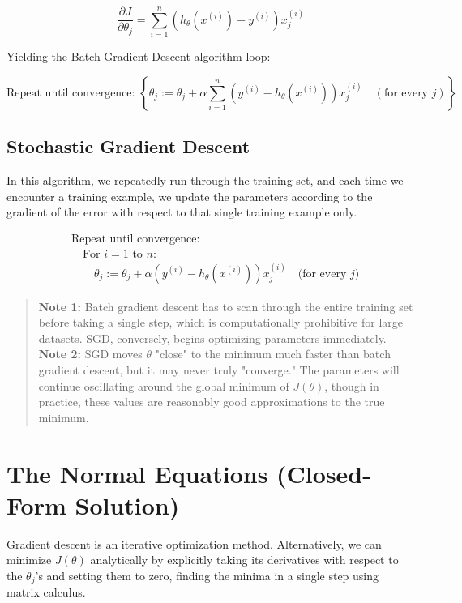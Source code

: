 \documentclass[12pt, a4paper]{report}
\begin{document}
\[ \frac{\partial J}{\partial \theta_j} = \sum_{i=1}^{n} (h_\theta(x^{(i)}) - y^{(i)}) x_j^{(i)} \]

Yielding the Batch Gradient Descent algorithm loop:

\[ \text{Repeat until convergence: } \left\{ \theta_j := \theta_j + \alpha \sum_{i=1}^{n} \left( y^{(i)} - h_\theta(x^{(i)}) \right) x_j^{(i)} \quad (\text{for every } j) \right\} \]

\subsection{Stochastic Gradient Descent}

In this algorithm, we repeatedly run through the training set, and each time we encounter a training example, we update the parameters according to the gradient of the error with respect to that single training example only.

\begin{align*}
& \text{Repeat until convergence:} \\
& \quad \text{For } i = 1 \text{ to } n: \\
& \quad \quad \theta_j := \theta_j + \alpha \left( y^{(i)} - h_\theta(x^{(i)}) \right) x_j^{(i)} \quad \text{(for every } j)
\end{align*}

\begin{quote}
\textbf{Note 1:} Batch gradient descent has to scan through the entire training set before taking a single step, which is computationally prohibitive for large datasets. SGD, conversely, begins optimizing parameters immediately. \\
\textbf{Note 2:} SGD moves $\theta$ "close" to the minimum much faster than batch gradient descent, but it may never truly "converge." The parameters will continue oscillating around the global minimum of $J(\theta)$, though in practice, these values are reasonably good approximations to the true minimum.
\end{quote}

\section{The Normal Equations (Closed-Form Solution)}

Gradient descent is an iterative optimization method. Alternatively, we can minimize $J(\theta)$ analytically by explicitly taking its derivatives with respect to the $\theta_j$'s and setting them to zero, finding the minima in a single step using matrix calculus.
\end{document}
